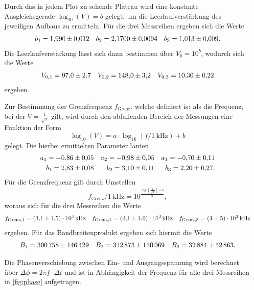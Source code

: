 Durch das in jedem Plot zu sehende Plateau wird eine konstante Ausgleichsgerade $\log_{10} (V) = b$ gelegt, um die Leerlaufverstärkung des jeweiligen Aufbaus zu ermitteln. Für die drei Messreihen ergeben sich die Werte
\begin{align*}
  b_1 = \num{1.99 \pm 0.012} && b_2 = \num{2.170 \pm 0.0094} && b_3 = \num{1.013 \pm 0.009}.
\end{align*}
Die Leerlaufverstärkung lässt sich dann bestimmen über $V_0 = 10^{b}$, wodurch sich die Werte
\begin{align*}
  V_{0,1} = \num{97 \pm 2.7} && V_{0,2} = \num{148 \pm 3.2} && V_{0,3} = \num{10.3 \pm 0.22}
\end{align*}
ergeben.

Zur Bestimmung der Grenzfrequenz $f_\mathrm{Grenz}$, welche definiert ist als die Frequenz, bei der $V = \frac{1}{\sqrt{2}}$ gilt, wird durch den abfallenden Bereich der Messungen eine Funktion der Form
\begin{equation*}
  \log_{10} (V) = a \cdot \log_{10} (f/\SI{1}{\kilo\hertz}) + b
\end{equation*}
gelegt. Die hierbei ermittelten Parameter lauten
\begin{align*}
  a_1 = \num{-0.86 \pm 0.05} && a_2 = \num{-0.98 \pm 0.05} && a_3 = \num{-0.7 \pm 0.11}\\
  b_1 = \num{2.83 \pm 0.08} && b_2 = \num{3.1 \pm 0.11} && b_3 = \num{2.2 \pm 0.27}.
\end{align*}
Für die Grenzfrequenz gilt durch Umstellen
\begin{equation*}
  f_\mathrm{Grenz}/\SI{1}{\kilo\hertz} = 10^{\frac{\log (\frac{1}{\sqrt{2}}) - b}{a}},
\end{equation*}
woraus sich für die drei Messreihen die Werte
\begin{align*}
  f_{\mathrm{Grenz},1} = \SI{3.1 \pm 1.5 e3}{\kilo\hertz} && f_{\mathrm{Grenz},2} = \SI{2.1 \pm 1.0 e3}{\kilo\hertz} && f_{\mathrm{Grenz},3} = \SI{3 \pm 5 e3}{\kilo\hertz}
\end{align*}
ergeben.
Für das Bandbreitenprodukt ergeben sich hiermit die Werte
\begin{align*}
  B_1 = \num{300758 \pm 146429} && B_2 = \num{312873 \pm 150069} && B_3 = \num{32884 \pm 52863}.
\end{align*}

Die Phasenverschiebung zwischen Ein- und Ausgangsspannung wird berechnet über $\Delta \phi = 2 \pi f \cdot \Delta t$ und ist in Abhängigkeit der Frequenz für alle drei Messreihen in \autoref{fig:phase} aufgetragen.


